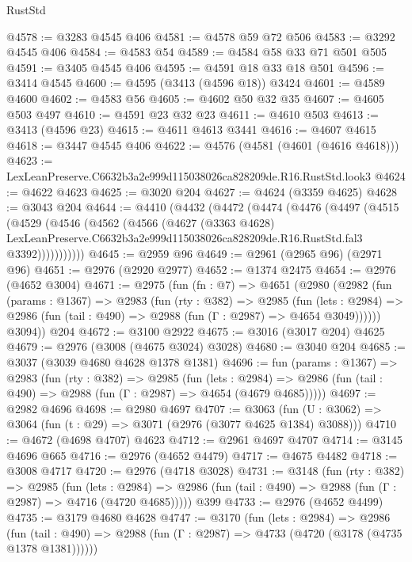 \begin{lexlean}{RustStd}
\begin{coremodule}
@4578 := @3283 @4545 @406
@4581 := @4578 @59 @72 @506
@4583 := @3292 @4545 @406
@4584 := @4583 @54
@4589 := @4584 @58 @33 @71 @501 @505
@4591 := @3405 @4545 @406
@4595 := @4591 @18 @33 @18 @501
@4596 := @3414 @4545
@4600 := @4595 (@3413 (@4596 @18)) @3424
@4601 := @4589 @4600
@4602 := @4583 @56
@4605 := @4602 @50 @32 @35
@4607 := @4605 @503 @497
@4610 := @4591 @23 @32 @23
@4611 := @4610 @503
@4613 := @3413 (@4596 @23)
@4615 := @4611 @4613 @3441
@4616 := @4607 @4615
@4618 := @3447 @4545 @406
@4622 := @4576 (@4581 (@4601 (@4616 @4618)))
@4623 := LexLeanPreserve.C6632b3a2e999d115038026ca828209de.R16.RustStd.look3
@4624 := @4622 @4623
@4625 := @3020 @204
@4627 := @4624 (@3359 @4625)
@4628 := @3043 @204
@4644 := @4410
    (@4432
      (@4472
        (@4474
          (@4476
            (@4497
              (@4515
                (@4529
                  (@4546
                    (@4562
                      (@4566
                        (@4627
                          (@3363 @4628)
                          LexLeanPreserve.C6632b3a2e999d115038026ca828209de.R16.RustStd.fal3
                          @3392)))))))))))
@4645 := @2959 @96
@4649 := @2961 (@2965 @96) (@2971 @96)
@4651 := @2976 (@2920 @2977)
@4652 := @1374 @2475
@4654 := @2976 (@4652 @3004)
@4671 := @2975
    (fun (fn : @7) =>
    @4651
      (@2980
        (@2982
          (fun (params : @1367) =>
          @2983
            (fun (rty : @382) =>
            @2985
              (fun (lets : @2984) =>
              @2986 (fun (tail : @490) => @2988 (fun (Γ : @2987) => @4654 @3049))))))
        @3094))
    @204
@4672 := @3100 @2922
@4675 := @3016 (@3017 @204) @4625
@4679 := @2976 (@3008 (@4675 @3024) @3028)
@4680 := @3040 @204
@4685 := @3037 (@3039 @4680 @4628 @1378 @1381)
@4696 := fun (params : @1367) =>
  @2983
    (fun (rty : @382) =>
    @2985
      (fun (lets : @2984) =>
      @2986 (fun (tail : @490) => @2988 (fun (Γ : @2987) => @4654 (@4679 @4685)))))
@4697 := @2982 @4696
@4698 := @2980 @4697
@4707 := @3063 (fun (U : @3062) => @3064 (fun (t : @29) => @3071 (@2976 (@3077 @4625 @1384) @3088)))
@4710 := @4672 (@4698 @4707) @4623
@4712 := @2961 @4697 @4707
@4714 := @3145 @4696 @665
@4716 := @2976 (@4652 @4479)
@4717 := @4675 @4482
@4718 := @3008 @4717
@4720 := @2976 (@4718 @3028)
@4731 := @3148
    (fun (rty : @382) =>
    @2985
      (fun (lets : @2984) =>
      @2986 (fun (tail : @490) => @2988 (fun (Γ : @2987) => @4716 (@4720 @4685)))))
    @399
@4733 := @2976 (@4652 @4499)
@4735 := @3179 @4680 @4628
@4747 := @3170
    (fun (lets : @2984) =>
    @2986
      (fun (tail : @490) => @2988 (fun (Γ : @2987) => @4733 (@4720 (@3178 (@4735 @1378 @1381))))))

\end{coremodule}
\end{lexlean}
